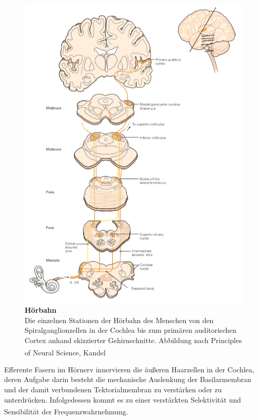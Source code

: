\documentclass[12pt,a4paper,pdftex]{article}
\begin{document}
\begin{figure}[H]
    \centering
    \includegraphics{pictures/auditory/hoerbahn_pathway.png}
    \caption[Hörbahn]{\textbf{Hörbahn} \\
    Die einzelnen Stationen der Hörbahn des Menschen von den Spiralganglionzellen in der Cochlea bis zum primären auditorischen Cortex anhand skizzierter Gehirnschnitte. Abbildung nach Principles of Neural Science, Kandel \textsuperscript{\cite[30]{kandel2013principles}}}
    \label{fig:hoerbahn_pathway}
\end{figure}

\newpage
\noindent Efferente Fasern im Hörnerv innervieren die äußeren Haarzellen  in der Cochlea, deren Aufgabe darin besteht die mechanische Auslenkung der Basilarmembran und der damit verbundenen Tektorialmembran  zu verstärken oder zu unterdrücken. Infolgedessen kommt es zu einer verstärkten Selektivität und Sensibilität der Frequenzwahrnehmung\textsuperscript{\cite[22]{paxinos2014rat}}.
\end{document}
